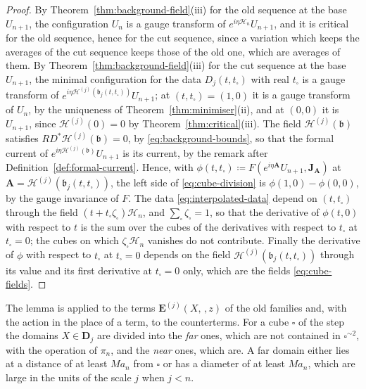 \documentclass[11pt]{preprint}
\makeatletter
\newcommand*{\bigcdot}{}%
\DeclareRobustCommand*{\bigcdot}{%
	\mathbin{\mathpalette\bigcdot@{}}%
}
\newcommand*{\bigcdot@scalefactor}{.7}
\newcommand*{\bigcdot@widthfactor}{1.15}
\newcommand*{\bigcdot@}[2]{%
	\sbox0{$#1\vcenter{}$}%
	\sbox2{$#1\cdot\m@th$}%
	\hbox to \bigcdot@widthfactor\wd2{%
		\hss
		\raise\ht0\hbox{%
			\scalebox{\bigcdot@scalefactor}{%
				\lower\ht0\hbox{$#1\bullet\m@th$}%
			}%
		}%
		\hss
	}%
}
\numberwithin{equation}{section}
\makeatother
\begin{document}
\begin{proof}
By Theorem~\ref{thm:background-field}(iii) for the old sequence at the base $U_{n+1}$, the configuration $U_n$ is a gauge transform of $e^{i\eta\mathcal H_n}U_{n+1}$, and it is critical for the old sequence, hence for the cut sequence, since a variation which keeps the averages of the cut sequence keeps those of the old one, which are averages of them. By Theorem~\ref{thm:background-field}(iii) for the cut sequence at the base $U_{n+1}$, the minimal configuration for the data $D_j(t, t_\square)$ with real $t_\square$ is a gauge transform of $e^{i\eta\mathcal H^{(j)}(\mathfrak b_j(t, t_\square))}U_{n+1}$; at $(t, t_\square) = (1, 0)$ it is a gauge transform of $U_n$, by the uniqueness of Theorem~\ref{thm:minimiser}(ii), and at $(0, 0)$ it is $U_{n+1}$, since $\mathcal H^{(j)}(0) = 0$ by Theorem~\ref{thm:critical}(iii). The field $\mathcal H^{(j)}(\mathfrak b)$ satisfies $RD^*\mathcal H^{(j)}(\mathfrak b) = 0$, by \eqref{eq:background-bounds}, so that the formal current of $e^{i\eta\mathcal H^{(j)}(\mathfrak b)}U_{n+1}$ is its current, by the remark after Definition~\ref{def:formal-current}. Hence, with $\phi(t, t_\square) \coloneqq F(e^{i\eta\mathbf A}U_{n+1}, \mathbf J_{\mathbf A})$ at $\mathbf A = \mathcal H^{(j)}(\mathfrak b_j(t, t_\square))$, the left side of \eqref{eq:cube-division} is $\phi(1, 0) - \phi(0, 0)$, by the gauge invariance of $F$. The data \eqref{eq:interpolated-data} depend on $(t, t_\square)$ through the field $(t + t_\square\zeta_\square)\mathcal H_n$, and $\sum_\square\zeta_\square = 1$, so that the derivative of $\phi(t, 0)$ with respect to $t$ is the sum over the cubes of the derivatives with respect to $t_\square$ at $t_\square = 0$; the cubes on which $\zeta_\square\mathcal H_n$ vanishes do not contribute. Finally the derivative of $\phi$ with respect to $t_\square$ at $t_\square = 0$ depends on the field $\mathcal H^{(j)}(\mathfrak b_j(t, t_\square))$ through its value and its first derivative at $t_\square = 0$ only, which are the fields \eqref{eq:cube-fields}.
\end{proof}

The lemma is applied to the terms $\mathbf E^{(j)}(X, \bigcdot\,, z)$ of the old families and, with the action in the place of a term, to the counterterms. For a cube $\square$ of the step the domains $X \in \mathbf D_j$ are divided into the \emph{far} ones, which are not contained in $\square^{\sim2}$, with the operation of $\pi_n$, and the \emph{near} ones, which are. A far domain either lies at a distance of at least $Ma_n$ from $\square$ or has a diameter of at least $Ma_n$, which are large in the units of the scale $j$ when $j < n$.
\end{document}
